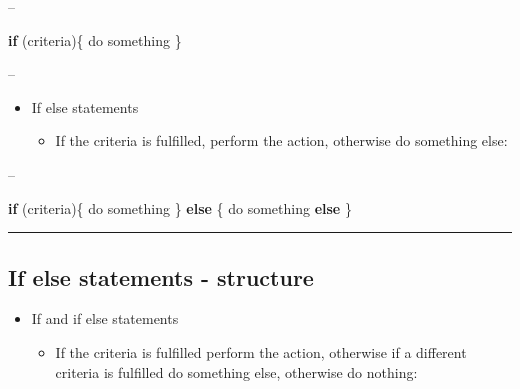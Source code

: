 \documentclass[]{article}
\newenvironment{Shaded}{\begin{snugshade}}{\end{snugshade}}
\newcommand{\ControlFlowTok}[1]{\textcolor[rgb]{0.13,0.29,0.53}{\textbf{#1}}}
\newcommand{\NormalTok}[1]{#1}
\providecommand{\tightlist}{%
  \setlength{\itemsep}{0pt}\setlength{\parskip}{0pt}}
\begin{document}
--

\begin{Shaded}
\begin{Highlighting}[]
\ControlFlowTok{if}\NormalTok{ (criteria)\{}
\NormalTok{  do something}
\NormalTok{\}}
\end{Highlighting}
\end{Shaded}

--

\begin{itemize}
\tightlist
\item
  If else statements

  \begin{itemize}
  \tightlist
  \item
    If the criteria is fulfilled, perform the action, otherwise do
    something else:
  \end{itemize}
\end{itemize}

--

\begin{Shaded}
\begin{Highlighting}[]
\ControlFlowTok{if}\NormalTok{ (criteria)\{}
\NormalTok{  do something}
\NormalTok{\} }\ControlFlowTok{else}\NormalTok{ \{}
\NormalTok{  do something }\ControlFlowTok{else}
\NormalTok{\}}
\end{Highlighting}
\end{Shaded}

\begin{center}\rule{0.5\linewidth}{\linethickness}\end{center}

\hypertarget{if-else-statements---structure-1}{%
\subsection{If else statements -
structure}\label{if-else-statements---structure-1}}

\begin{itemize}
\tightlist
\item
  If and if else statements

  \begin{itemize}
  \tightlist
  \item
    If the criteria is fulfilled perform the action, otherwise if a
    different criteria is fulfilled do something else, otherwise do
    nothing:
  \end{itemize}
\end{itemize}
\end{document}
